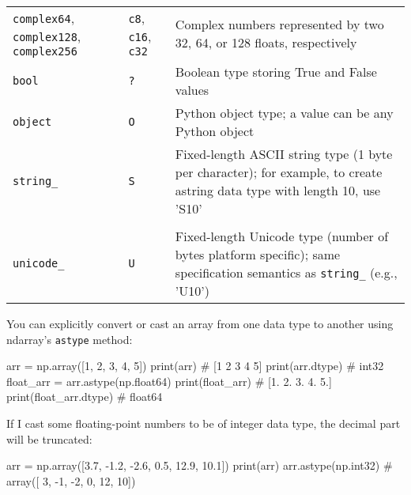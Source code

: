 \begin{table}
\begin{tabularx}{\textwidth}{llX}
        \verb|complex64|, \verb|complex128|, \verb|complex256| & \verb|c8|, \verb|c16|, \verb|c32| & Complex numbers represented by two 32, 64, or 128 floats, respectively                                                      \\
        \verb|bool|                                            & \verb|?|                          & Boolean type storing True and False values                                                                                  \\
        \verb|object|                                          & \verb|O|                          & Python object type; a value can be any Python object                                                                        \\
        \verb|string_|                                         & \verb|S|                          & Fixed-length ASCII string type (1 byte per character); for example, to create astring data type with length 10, use 'S10'   \\                                                                                                                          \\
        \verb|unicode_|                                        & \verb|U|                          & Fixed-length Unicode type (number of bytes platform specific); same specification semantics as \verb|string_| (e.g., 'U10') \\
        \hline
    \end{tabularx}
\end{table}


You can explicitly convert or cast an array from one data type to another using ndarray’s \verb|astype| method:
\begin{pyc}
arr = np.array([1, 2, 3, 4, 5])
print(arr) # [1 2 3 4 5]
print(arr.dtype) # int32
float_arr = arr.astype(np.float64)
print(float_arr) # [1. 2. 3. 4. 5.]
print(float_arr.dtype) # float64
\end{pyc}

If I cast some floating-point numbers to be of integer data type, the decimal part will be truncated:
\begin{pyc}
arr = np.array([3.7, -1.2, -2.6, 0.5, 12.9, 10.1])
print(arr)
arr.astype(np.int32)
# array([ 3, -1, -2,  0, 12, 10])
\end{pyc}

